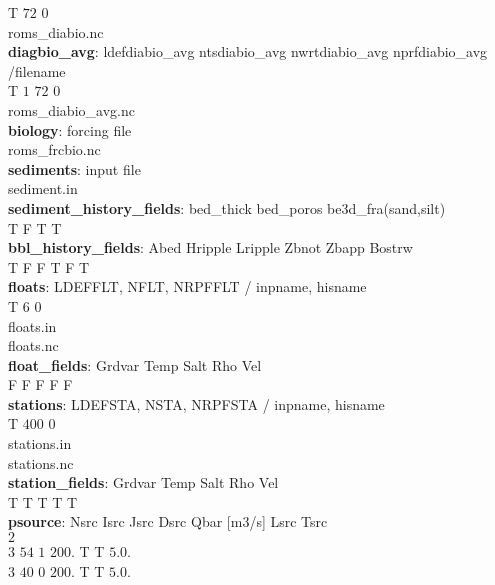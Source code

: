                         T          $72$             $0$ \\
                                 roms\_diabio.nc \\
\textbf{diagbio\_avg}: ldefdiabio\_avg  ntsdiabio\_avg  nwrtdiabio\_avg  nprfdiabio\_avg
/filename \\
                  T              $1$             $72$              $0$ \\
                                 roms\_diabio\_avg.nc \\
\textbf{biology}:   forcing file \\
           roms\_frcbio.nc \\
\textbf{sediments}: input file \\
           sediment.in \\
\textbf{sediment\_history\_fields}: bed\_thick bed\_poros be3d\_fra(sand,silt) \\
                            T         F        T  T \\
\textbf{bbl\_history\_fields}: Abed Hripple Lripple Zbnot Zbapp Bostrw \\
                     T      F       F      T     F     T \\
\textbf{floats}: LDEFFLT, NFLT, NRPFFLT / inpname, hisname \\
           T       $6$      $0$ \\
                                   floats.in \\
                                   floats.nc \\
\textbf{float\_fields}:  Grdvar Temp Salt Rho Vel \\
                 F     F    F    F   F \\
\textbf{stations}: LDEFSTA, NSTA, NRPFSTA / inpname, hisname \\
             T      $400$      $0$ \\
                                    stations.in \\
                                    stations.nc \\
\textbf{station\_fields}:  Grdvar Temp Salt Rho Vel \\
                   T     T    T    T   T \\
\textbf{psource}:   Nsrc  Isrc  Jsrc  Dsrc  Qbar [m3/s]    Lsrc        Tsrc \\
            $2$ \\
            $3$    $54$     $1$    $200. $   T T      $5. 0.$ \\
            $3$    $40$     0    $200.$      T T      $5. 0.$ \\
 

